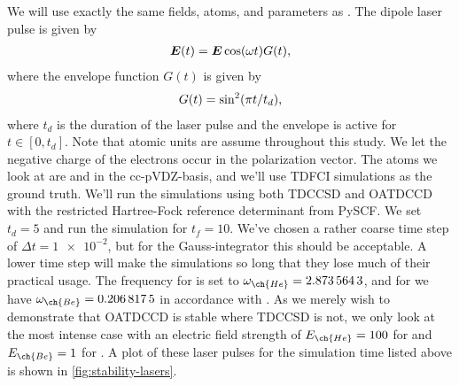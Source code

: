         We will use exactly the same fields, atoms, and parameters as
        \citeauthor{pedersen2018symplectic}.
        The dipole laser pulse is given by
        \begin{align}
            \vfg{E}(t)
            = \vfg{E} \cosine(\omega t) G(t),
        \end{align}
        where the envelope function $G(t)$ is given by
        \begin{align}
            G(t)
            = \sine^2(\pi t / t_d),
        \end{align}
        where $t_d$ is the duration of the laser pulse and the envelope is
        active for $t \in [0, t_d]$.
        Note that atomic units are assume throughout this study.
        We let the negative charge of the electrons occur in the polarization
        vector.
        The atoms we look at are  and  in the cc-pVDZ-basis, and
        we'll use TDFCI simulations as the ground truth.
        We'll run the simulations using both TDCCSD and OATDCCD with the
        restricted Hartree-Fock reference determinant from PySCF.
        We set $t_d = \num{5}$ and run the simulation for $t_f = \num{10}$.
        We've chosen a rather coarse time step of $\Delta t = \num{1e-2}$, but
        for the Gauss-integrator this should be acceptable.
        A lower time step will make the simulations so long that they lose much
        of their practical usage.
        The frequency for  is set to $\omega_{\ch{He}} =
        \num{2.8735643}$, and for  we have $\omega_{\ch{Be}} =
        \num{0.2068175}$ in accordance with \citeauthor{pedersen2018symplectic}
        \cite{pedersen2018symplectic}.
        As we merely wish to demonstrate that OATDCCD is stable where TDCCSD is
        not, we only look at the most intense case with an electric field
        strength of $E_{\ch{He}} = \num{100}$ for  and $E_{\ch{Be}} =
        \num{1}$ for .
        A plot of these laser pulses for the simulation time listed above is
        shown in \autoref{fig:stability-lasers}.

